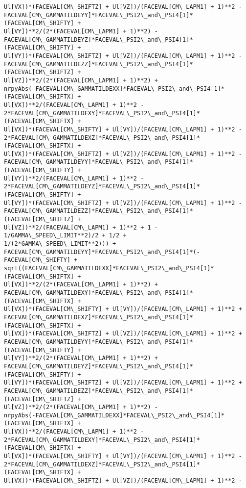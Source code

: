 \documentclass[landscape,letterpaper,10pt,english]{article}
\begin{document}
\begin{Verbatim}[commandchars=\\\{\}]
Ul[VX])*(FACEVAL[CM\_SHIFTZ] + Ul[VZ])/(FACEVAL[CM\_LAPM1] + 1)**2 -
FACEVAL[CM\_GAMMATILDEYY]*FACEVAL\_PSI2\_and\_PSI4[1]*(FACEVAL[CM\_SHIFTY] +
Ul[VY])**2/(2*(FACEVAL[CM\_LAPM1] + 1)**2) -
FACEVAL[CM\_GAMMATILDEYZ]*FACEVAL\_PSI2\_and\_PSI4[1]*(FACEVAL[CM\_SHIFTY] +
Ul[VY])*(FACEVAL[CM\_SHIFTZ] + Ul[VZ])/(FACEVAL[CM\_LAPM1] + 1)**2 -
FACEVAL[CM\_GAMMATILDEZZ]*FACEVAL\_PSI2\_and\_PSI4[1]*(FACEVAL[CM\_SHIFTZ] +
Ul[VZ])**2/(2*(FACEVAL[CM\_LAPM1] + 1)**2) +
nrpyAbs(-FACEVAL[CM\_GAMMATILDEXX]*FACEVAL\_PSI2\_and\_PSI4[1]*(FACEVAL[CM\_SHIFTX] +
Ul[VX])**2/(FACEVAL[CM\_LAPM1] + 1)**2 -
2*FACEVAL[CM\_GAMMATILDEXY]*FACEVAL\_PSI2\_and\_PSI4[1]*(FACEVAL[CM\_SHIFTX] +
Ul[VX])*(FACEVAL[CM\_SHIFTY] + Ul[VY])/(FACEVAL[CM\_LAPM1] + 1)**2 -
2*FACEVAL[CM\_GAMMATILDEXZ]*FACEVAL\_PSI2\_and\_PSI4[1]*(FACEVAL[CM\_SHIFTX] +
Ul[VX])*(FACEVAL[CM\_SHIFTZ] + Ul[VZ])/(FACEVAL[CM\_LAPM1] + 1)**2 -
FACEVAL[CM\_GAMMATILDEYY]*FACEVAL\_PSI2\_and\_PSI4[1]*(FACEVAL[CM\_SHIFTY] +
Ul[VY])**2/(FACEVAL[CM\_LAPM1] + 1)**2 -
2*FACEVAL[CM\_GAMMATILDEYZ]*FACEVAL\_PSI2\_and\_PSI4[1]*(FACEVAL[CM\_SHIFTY] +
Ul[VY])*(FACEVAL[CM\_SHIFTZ] + Ul[VZ])/(FACEVAL[CM\_LAPM1] + 1)**2 -
FACEVAL[CM\_GAMMATILDEZZ]*FACEVAL\_PSI2\_and\_PSI4[1]*(FACEVAL[CM\_SHIFTZ] +
Ul[VZ])**2/(FACEVAL[CM\_LAPM1] + 1)**2 + 1 - 1/GAMMA\_SPEED\_LIMIT**2)/2 + 1/2 +
1/(2*GAMMA\_SPEED\_LIMIT**2))) +
FACEVAL[CM\_GAMMATILDEYY]*FACEVAL\_PSI2\_and\_PSI4[1]*(-FACEVAL[CM\_SHIFTY] +
sqrt((FACEVAL[CM\_GAMMATILDEXX]*FACEVAL\_PSI2\_and\_PSI4[1]*(FACEVAL[CM\_SHIFTX] +
Ul[VX])**2/(2*(FACEVAL[CM\_LAPM1] + 1)**2) +
FACEVAL[CM\_GAMMATILDEXY]*FACEVAL\_PSI2\_and\_PSI4[1]*(FACEVAL[CM\_SHIFTX] +
Ul[VX])*(FACEVAL[CM\_SHIFTY] + Ul[VY])/(FACEVAL[CM\_LAPM1] + 1)**2 +
FACEVAL[CM\_GAMMATILDEXZ]*FACEVAL\_PSI2\_and\_PSI4[1]*(FACEVAL[CM\_SHIFTX] +
Ul[VX])*(FACEVAL[CM\_SHIFTZ] + Ul[VZ])/(FACEVAL[CM\_LAPM1] + 1)**2 +
FACEVAL[CM\_GAMMATILDEYY]*FACEVAL\_PSI2\_and\_PSI4[1]*(FACEVAL[CM\_SHIFTY] +
Ul[VY])**2/(2*(FACEVAL[CM\_LAPM1] + 1)**2) +
FACEVAL[CM\_GAMMATILDEYZ]*FACEVAL\_PSI2\_and\_PSI4[1]*(FACEVAL[CM\_SHIFTY] +
Ul[VY])*(FACEVAL[CM\_SHIFTZ] + Ul[VZ])/(FACEVAL[CM\_LAPM1] + 1)**2 +
FACEVAL[CM\_GAMMATILDEZZ]*FACEVAL\_PSI2\_and\_PSI4[1]*(FACEVAL[CM\_SHIFTZ] +
Ul[VZ])**2/(2*(FACEVAL[CM\_LAPM1] + 1)**2) -
nrpyAbs(-FACEVAL[CM\_GAMMATILDEXX]*FACEVAL\_PSI2\_and\_PSI4[1]*(FACEVAL[CM\_SHIFTX] +
Ul[VX])**2/(FACEVAL[CM\_LAPM1] + 1)**2 -
2*FACEVAL[CM\_GAMMATILDEXY]*FACEVAL\_PSI2\_and\_PSI4[1]*(FACEVAL[CM\_SHIFTX] +
Ul[VX])*(FACEVAL[CM\_SHIFTY] + Ul[VY])/(FACEVAL[CM\_LAPM1] + 1)**2 -
2*FACEVAL[CM\_GAMMATILDEXZ]*FACEVAL\_PSI2\_and\_PSI4[1]*(FACEVAL[CM\_SHIFTX] +
Ul[VX])*(FACEVAL[CM\_SHIFTZ] + Ul[VZ])/(FACEVAL[CM\_LAPM1] + 1)**2 -

\end{Verbatim}
\end{document}
